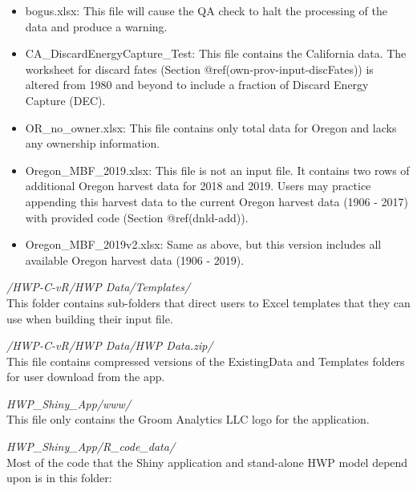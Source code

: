 \documentclass[
  openany]{book}
\begin{document}
\begin{itemize}
\item
  bogus.xlsx: This file will cause the QA check to halt the processing
  of the data and produce a warning.
\item
  CA\_DiscardEnergyCapture\_Test: This file contains the California
  data. The worksheet for discard fates (Section
  @ref(own-prov-input-discFates)) is altered from 1980 and beyond to
  include a fraction of Discard Energy Capture (DEC).
\item
  OR\_no\_owner.xlsx: This file contains only total data for Oregon and
  lacks any ownership information.
\item
  Oregon\_MBF\_2019.xlsx: This file is not an input file. It contains
  two rows of additional Oregon harvest data for 2018 and 2019. Users
  may practice appending this harvest data to the current Oregon harvest
  data (1906 - 2017) with provided code (Section @ref(dnld-add)).
\item
  Oregon\_MBF\_2019v2.xlsx: Same as above, but this version includes all
  available Oregon harvest data (1906 - 2019).
\end{itemize}

\emph{/HWP-C-vR/HWP Data/Templates/}\\
This folder contains sub-folders that direct users to Excel templates
that they can use when building their input file.

\emph{/HWP-C-vR/HWP Data/HWP Data.zip/}\\
This file contains compressed versions of the ExistingData and Templates
folders for user download from the app.

\emph{HWP\_Shiny\_App/www/}\\
This file only contains the Groom Analytics LLC logo for the
application.

\emph{HWP\_Shiny\_App/R\_code\_data/}\\
Most of the code that the Shiny application and stand-alone HWP model
depend upon is in this folder:
\end{document}
